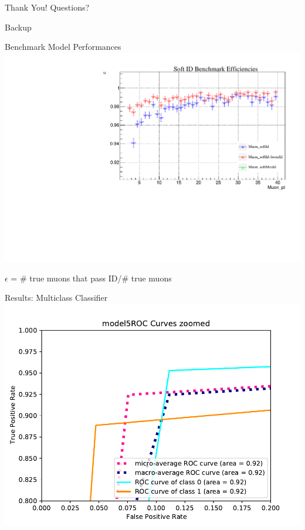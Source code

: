\documentclass[10pt,handout]{beamer}
\begin{document}
\begin{frame}{Thank You!}
\centering
Questions?
\end{frame}

\begin{frame}{}
\centering
Backup
\end{frame}






\begin{frame}{Benchmark Model Performances}
\centering
\includegraphics[scale=.5]{benchmarkEfficiency_TTjetszoomed.pdf}

$\epsilon$ = \# true muons that pass ID/\# true muons
\end{frame}

\begin{frame}{Results: Multiclass Classifier}
\centering
\includegraphics[scale=0.6]{model5_ROCcurveszoom.pdf}
\end{frame}
\end{document}
